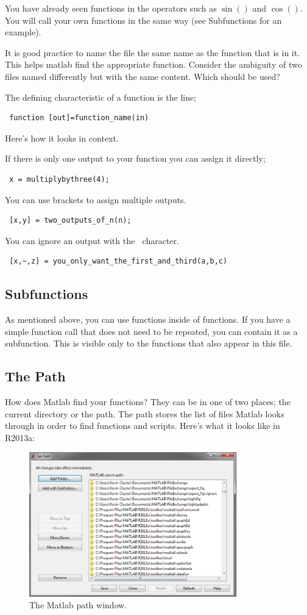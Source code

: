 You have already seen functions in the operators such as $\sin()$ and $\cos()$.
 You will call your own functions in the same way (see Subfunctions for an example).
 
It is good practice to name the file the same name as the function that is in it.
 This helps matlab find the appropriate function.
 Consider the ambiguity of two files named differently but with the same content.
 Which should be used?

The defining characteristic of a function is the line;
\begin{verbatim}
 function [out]=function_name(in)
\end{verbatim}

Here's how it looks in context.
\begin{quote}

\end{quote}

If there is only one output to your function you can assign it directly;
\begin{verbatim}
 x = multiplybythree(4);
\end{verbatim}

You can use brackets to assign multiple outputs.
\begin{verbatim}
 [x,y] = two_outputs_of_n(n);
\end{verbatim}

You can ignore an output with the $~$ character.
\begin{verbatim}
 [x,~,z] = you_only_want_the_first_and_third(a,b,c)
\end{verbatim}

\pagebreak
\subsection{Subfunctions}
As mentioned above, you can use functions inside of functions.
 If you have a simple function call that does not need to be repeated, you can contain it as a subfunction.
 This is visible only to the functions that also appear in this file.

\begin{quote}

\end{quote}


\pagebreak
\subsection{The Path}
How does Matlab find your functions?
 They can be in one of two places; the current directory or the path.
 The path stores the list of files Matlab looks through in order to find functions and scripts.
 Here's what it looks like in R2013a:

\begin{figure}[ht!]
\centering
\includegraphics[width=90mm]{img/path.png}
\caption{The Matlab path window.}
\label{overflow}
\end{figure}